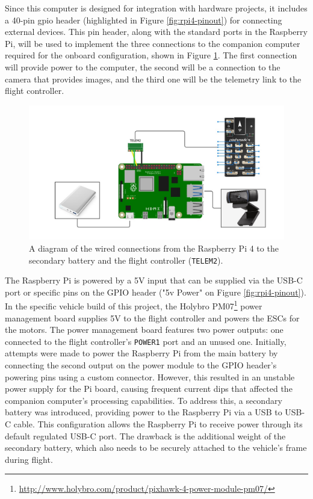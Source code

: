 Since this computer is designed for integration with hardware projects, it includes a 40-pin \acrfull{gpio} header (highlighted in Figure \ref{fig:rpi4-pinout}) for connecting external devices.
This pin header, along with the standard ports in the Raspberry Pi, will be used to implement the three connections to the companion computer required for the onboard configuration, shown in Figure \ref{fig:wiring}.
The first connection will provide power to the computer, the second will be a connection to the camera that provides images, and the third one will be the telemetry link to the flight controller.

\begin{figure}
  \centering
  \includegraphics[width=\textwidth,keepaspectratio]{img/wiring-diagram.jpg}
  \caption{A diagram of the wired connections from the Raspberry Pi 4 to the secondary battery and the flight controller (\texttt{TELEM2}).}
  \label{fig:wiring}
\end{figure}

The Raspberry Pi is powered by a 5V input that can be supplied via the USB-C port or specific pins on the GPIO header ("5v Power" on Figure \ref{fig:rpi4-pinout}). 
In the specific vehicle build of this project, the Holybro PM07\footnote{\url{http://www.holybro.com/product/pixhawk-4-power-module-pm07/}} power management board supplies 5V to the flight controller and powers the ESCs for the motors. 
The power management board features two power outputs: one connected to the flight controller's \texttt{POWER1} port and an unused one. 
Initially, attempts were made to power the Raspberry Pi from the main battery by connecting the second output on the power module to the GPIO header's powering pins using a custom connector. 
However, this resulted in an unstable power supply for the Pi board, causing frequent current dips that affected the companion computer's processing capabilities. 
To address this, a secondary battery was introduced, providing power to the Raspberry Pi via a USB to USB-C cable. 
This configuration allows the Raspberry Pi to receive power through its default regulated USB-C port. 
The drawback is the additional weight of the secondary battery, which also needs to be securely attached to the vehicle's frame during flight.

